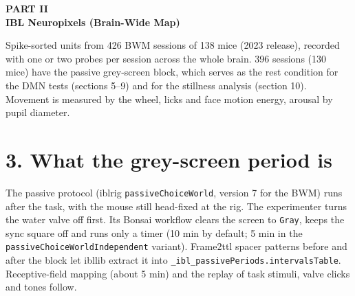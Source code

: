 \documentclass[10pt,a4paper]{article}
\begin{document}
\clearpage
{\small\bfseries\color{accent} PART II}\\[2pt]
{\LARGE\bfseries IBL Neuropixels (Brain-Wide Map)}\par\medskip

Spike-sorted units from 426 BWM sessions of 138 mice (2023 release), recorded with one or two probes per session across the whole brain. 396 sessions (130 mice) have the passive grey-screen block, which serves as the rest condition for the DMN tests (sections 5--9) and for the stillness analysis (section 10). Movement is measured by the wheel, licks and face motion energy, arousal by pupil diameter.

\section{3. What the grey-screen period is}
The passive protocol (iblrig \texttt{passiveChoiceWorld}, version 7 for the BWM) runs after the task, with the mouse still head-fixed at the rig. The experimenter turns the water valve off first. Its Bonsai workflow clears the screen to \texttt{Gray}, keeps the sync square off and runs only a timer (10 min by default; 5 min in the \texttt{passiveChoiceWorldIndependent} variant). Frame2ttl spacer patterns before and after the block let ibllib extract it into \texttt{\_\allowbreak{}ibl\_\allowbreak{}passivePeriods.intervalsTable}. Receptive-field mapping (about 5 min) and the replay of task stimuli, valve clicks and tones follow.
\end{document}
